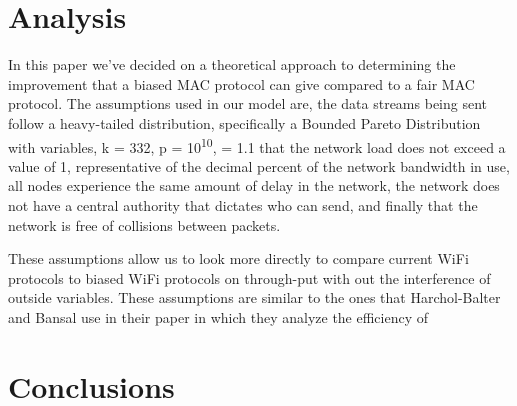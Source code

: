 \documentclass{sigcomm-alternate}
\begin{document}
\section{Analysis}
\label{section:analysis}


In this paper we've decided on a theoretical approach to determining the improvement that a biased MAC protocol can give compared to a fair MAC protocol. The assumptions used in our model are, the data streams being sent follow a heavy-tailed distribution, specifically a Bounded Pareto Distribution with variables, k = 332, p = 10\textsuperscript{10}, \textalpha  = 1.1
 that the network load does not exceed a value of 1, representative of the decimal percent of the network bandwidth in use, all nodes experience the same amount of delay in the network, the network does not have a central authority that dictates who can send, and finally that the network is free of collisions between packets. 

These assumptions allow us to look more directly to compare current WiFi protocols to biased WiFi protocols on through-put with out the interference of outside variables. These assumptions are similar to the ones that Harchol-Balter and Bansal use in their paper \cite{Unfair} in which they analyze the efficiency of 


\section{Conclusions}
\label{section:conclusions}

 





\balancecolumns
\end{document}
